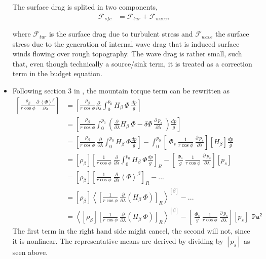 \documentclass[11pt]{article}
\numberwithin{equation}{section}
\newcommand{\la}{\langle}
\newcommand{\ra}{\rangle}
\newcommand{\lara}[1]{\left\la{#1}\right\ra}
\newcommand{\cphi}{\cos \phi}
\newcommand{\rb}{\rho_\beta}
\begin{document}
\begin{itemize}
The surface drag is splited in two components,
\begin{align}
\mathcal{F}_{sfc}&= \mathcal{F}_{tur} + \mathcal{F}_{wave},
\end{align}

where $\mathcal{F}_{tur}$ is the surface drag due to turbulent stress and $\mathcal{F}_{wave}$ the surface stress due to the generation of internal wave drag that is induced surface winds flowing over rough topography. The wave drag is rather small, such that, even though technically a source/sink term, it is treated as a correction term in the budget equation.


\item Following section 3 in \citet{Boer1982}, the mountain torque term can be rewritten as 
\begin{align*}
\left[\frac{\rb }{r \cphi} \frac{\partial~\lara{\Phi}^\beta  }{\partial \lambda}  \right] & = \left[ \frac{\rb}{r \cphi} \frac{\partial}{\partial \lambda}  \int_0^{p_0} H_\beta  ~\Phi ~ \frac{dp}{g}\right]\\
&= \left[ \frac{\rb}{r \cphi} \int_0^{p_0}   \left( \frac{\partial}{\partial \lambda}  H_\beta  ~\Phi - \delta \Phi ~ \frac{\partial~p_s}{\partial \lambda} ~ \right) \frac{dp}{g}\right]\\
&= \left[ \frac{\rb}{r \cphi} ~ \frac{\partial}{\partial \lambda}  \int_0^{p_0} H_\beta  ~\Phi  \frac{dp}{g}\right] - \int_0^{p_0}  \left[~\Phi_s~ \frac{1}{r \cphi} ~\frac{\partial~p_s}{\partial \lambda}\right] [H_\beta] \frac{dp}{g}\\
&= [\rb]  \left[ \frac{1}{r \cphi} ~ \frac{\partial}{\partial \lambda}  \int_0^{p_0} H_\beta  ~\Phi  \frac{dp}{g}\right]_R - \left[~\frac{\Phi_s}{g}~ \frac{1}{r \cphi} ~\frac{\partial~p_s}{\partial \lambda}\right] [p_s] \\
&= [\rb]  \left[ \frac{1}{r \cphi} ~ \frac{\partial}{\partial \lambda}  \lara{\Phi}^\beta \right]_R - ... \\
&= [\rb]  \lara{ \left[ \frac{1}{r \cphi} ~ \frac{\partial}{\partial \lambda} \left( H_\beta  ~\Phi  \right)   \right]_R}^{[\beta]} - ...  \\
&=\lara{  [\rb]   \left[ \frac{1}{r \cphi} ~ \frac{\partial}{\partial \lambda} \left( H_\beta  ~\Phi  \right)   \right]_R}^{[\beta]} - \left[~\frac{\Phi_s}{g}~ \frac{1}{r \cphi} ~\frac{\partial~p_s}{\partial \lambda}\right]  [p_s]~~\mathtt{Pa^2} 
\end{align*}
The first term in the right hand side might cancel, the second will not, since it is nonlinear. The representative means are derived by dividing by $[p_s]$ as seen above.
\end{itemize}
\end{document}
